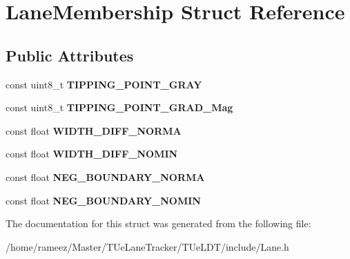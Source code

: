 \hypertarget{structLaneMembership}{\section{Lane\-Membership Struct Reference}
\label{structLaneMembership}
}
\subsection*{Public Attributes}
\begin{DoxyCompactItemize}
\item 
\hypertarget{structLaneMembership_aaafc93ecaca63ffb997f76bb37509e0e}{const uint8\-\_\-t {\bfseries T\-I\-P\-P\-I\-N\-G\-\_\-\-P\-O\-I\-N\-T\-\_\-\-G\-R\-A\-Y}}\label{structLaneMembership_aaafc93ecaca63ffb997f76bb37509e0e}

\item 
\hypertarget{structLaneMembership_a85f42f0e11a66b8e1bf92b196f7b75f2}{const uint8\-\_\-t {\bfseries T\-I\-P\-P\-I\-N\-G\-\_\-\-P\-O\-I\-N\-T\-\_\-\-G\-R\-A\-D\-\_\-\-Mag}}\label{structLaneMembership_a85f42f0e11a66b8e1bf92b196f7b75f2}

\item 
\hypertarget{structLaneMembership_aff8a106dd684a05f84493c60cc1bbbda}{const float {\bfseries W\-I\-D\-T\-H\-\_\-\-D\-I\-F\-F\-\_\-\-N\-O\-R\-M\-A}}\label{structLaneMembership_aff8a106dd684a05f84493c60cc1bbbda}

\item 
\hypertarget{structLaneMembership_a7f5ee55eafd81eb6fcbe68e1751f150e}{const float {\bfseries W\-I\-D\-T\-H\-\_\-\-D\-I\-F\-F\-\_\-\-N\-O\-M\-I\-N}}\label{structLaneMembership_a7f5ee55eafd81eb6fcbe68e1751f150e}

\item 
\hypertarget{structLaneMembership_a99a4cc20750e48c300ca6912654da175}{const float {\bfseries N\-E\-G\-\_\-\-B\-O\-U\-N\-D\-A\-R\-Y\-\_\-\-N\-O\-R\-M\-A}}\label{structLaneMembership_a99a4cc20750e48c300ca6912654da175}

\item 
\hypertarget{structLaneMembership_ac21253cf08f15cf05ff5be79fdf28eb6}{const float {\bfseries N\-E\-G\-\_\-\-B\-O\-U\-N\-D\-A\-R\-Y\-\_\-\-N\-O\-M\-I\-N}}\label{structLaneMembership_ac21253cf08f15cf05ff5be79fdf28eb6}

\end{DoxyCompactItemize}


The documentation for this struct was generated from the following file\-:\begin{DoxyCompactItemize}
\item 
/home/rameez/\-Master/\-T\-Ue\-Lane\-Tracker/\-T\-Ue\-L\-D\-T/include/Lane.\-h\end{DoxyCompactItemize}

